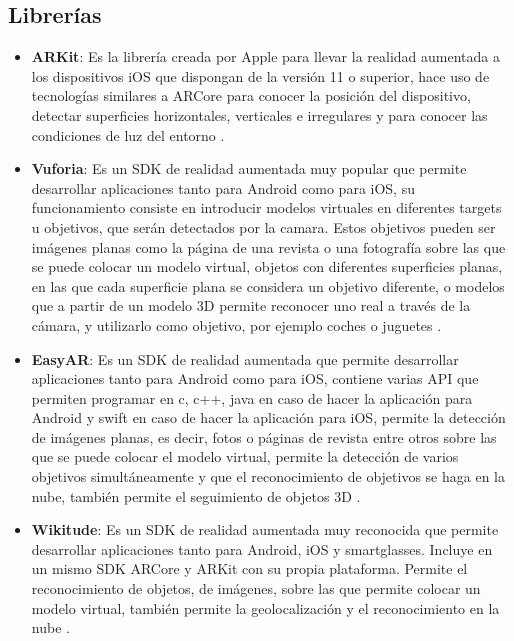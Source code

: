 \subsection{Librerías}
\begin{itemize}
  \item \textbf{ARKit}: Es la librería creada por Apple para llevar la realidad aumentada a los dispositivos iOS que dispongan de la versión 11 o superior, hace uso de tecnologías similares a ARCore para conocer la posición del dispositivo, detectar superficies horizontales, verticales e irregulares y para conocer las condiciones de luz del entorno \cite{arkit}.

  \item \textbf{Vuforia}: Es un SDK de realidad aumentada muy popular que permite desarrollar aplicaciones tanto para Android como para iOS, su funcionamiento consiste en introducir modelos virtuales en diferentes targets u objetivos, que serán detectados por la camara. Estos objetivos pueden ser imágenes planas como la página de una revista o una fotografía sobre las que se puede colocar un modelo virtual, objetos con diferentes superficies planas, en las que cada superficie plana se considera un objetivo diferente, o modelos que a partir de un modelo 3D permite reconocer uno real a través de la cámara, y utilizarlo como objetivo, por ejemplo coches o juguetes \cite{vuforia}.

  \item \textbf{EasyAR}: Es un SDK de realidad aumentada que permite desarrollar aplicaciones tanto para Android como para iOS, contiene varias API que permiten programar en c, c++, java en caso de hacer la aplicación para Android y swift en caso de hacer la aplicación para iOS, permite la detección de imágenes planas, es decir, fotos o páginas de revista entre otros sobre las que se puede colocar el modelo virtual, permite la detección de varios objetivos simultáneamente y que el reconocimiento de objetivos se haga en la nube, también permite el seguimiento de objetos 3D \cite{easyar}.

  \item \textbf{Wikitude}: Es un SDK de realidad aumentada muy reconocida que permite desarrollar aplicaciones tanto para Android, iOS y smartglasses. Incluye en un mismo SDK ARCore y ARKit con su propia plataforma. Permite el reconocimiento de objetos, de imágenes, sobre las que permite colocar un modelo virtual, también permite la geolocalización y el reconocimiento en la nube \cite{wikitude}.
\end{itemize}


